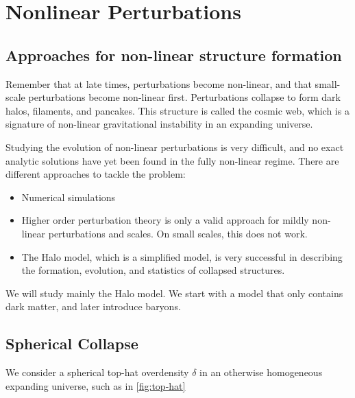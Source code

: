 \chapter{Nonlinear Perturbations}

\section{Approaches for non-linear structure formation}

Remember that at late times, perturbations become non-linear, and that small-scale perturbations become non-linear first.
Perturbations collapse to form dark halos, filaments, and pancakes.
This structure is called the cosmic web, which is a signature of non-linear gravitational instability in an expanding universe.

Studying the evolution of non-linear perturbations is very difficult, and no exact analytic solutions have yet been found in the fully non-linear regime.
There are different approaches to tackle the problem:
\begin{itemize}
	\item Numerical simulations
	\item Higher order perturbation theory is only a valid approach for mildly non-linear perturbations and scales.
	On small scales, this does not work.
	\item The Halo model, which is a simplified model, is very successful in describing the formation, evolution, and statistics of collapsed structures.
\end{itemize}

We will study mainly the Halo model. We start with a model that only contains dark matter, and later introduce baryons.

\section{Spherical Collapse}

We consider a spherical top-hat overdensity $\delta$ in an otherwise homogeneous expanding universe, such as in \cref{fig:top-hat}


